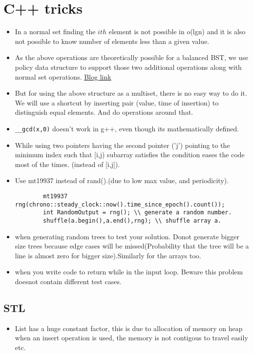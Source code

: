 \documentclass[../Notes.tex]{subfiles}
\begin{document}
\chapter{C++ tricks}

\begin{itemize}
	\item In a normal set finding the $ith$ element is not possible in o(lgn)
	and it is also not possible to know number of elements less than a given value.
	\item As the above operations are theoretically possible for a balanced BST, we use policy data structure to support those two additional operations along with normal set operations. \href{https://codeforces.com/blog/entry/11080}{Blog link}
	\item But for using the above structure as a multiset, there is no easy way to do it. We will use a shortcut by inserting pair (value, time of insertion) to distinguish equal elements. And do operations around that.
	\item \texttt{\_\_gcd(x,0)} doesn't work in g++, even though its mathematically defined.
	\item While using two pointers having the second pointer ('j') pointing to the minimum index such that [i,j) subarray satisfies the condition eases the code most of the times. (instead of [i,j]).
	\item Use mt19937 instead of rand().(due to low max value, and periodicity).
	\begin{lstlisting}
		mt19937 rng(chrono::steady_clock::now().time_since_epoch().count());
		int RandomOutput = rng(); \\ generate a random number.
		shuffle(a.begin(),a.end(),rng); \\ shuffle array a.
	\end{lstlisting}
	\item when generating random trees to test your solution. Donot generate bigger size trees because edge cases will be missed(Probability that the tree will be a line is almost zero for bigger size).Similarly for the arrays too.
	\item when you write code to return while in the input loop. Beware this problem doesnot contain different test cases.
\end{itemize}

\section{STL}
\begin{itemize}
	\item List has a huge constant factor, this is due to allocation of memory on heap when an insert operation is used, the memory is not contigous to travel easily etc.
\end{itemize}
\end{document}
